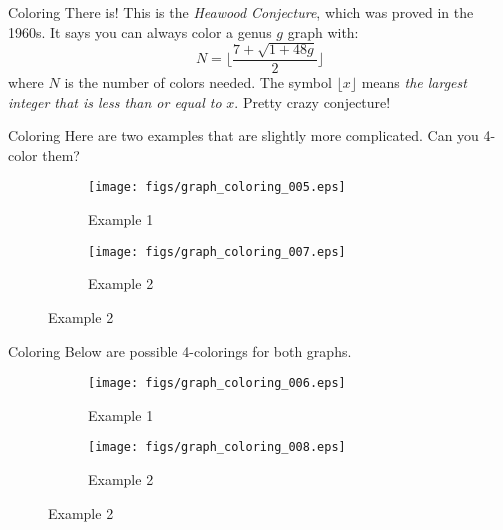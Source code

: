 \documentclass{beamer}
\newcommand{\floor}[2][]{#1\lfloor#2#1\rfloor}
\begin{document}
    \begin{frame}{Coloring}
        There is! This is the \textit{Heawood Conjecture}, which was proved in the 1960s. It
        says you can always color a genus $g$ graph with:
        \begin{equation}
            N=\floor{\frac{7+\sqrt{1+48g}}{2}}
        \end{equation}
        where $N$ is the number of colors needed. The symbol $\floor{x}$ means
        \textit{the largest integer that is less than or equal to} $x$. Pretty crazy
        conjecture!
    \end{frame}
    \begin{frame}{Coloring}
        Here are two examples that are slightly more complicated.
        Can you 4-color them?
        \begin{figure}
            \centering
            \begin{subfigure}[b]{0.49\textwidth}
                \centering
                \texttt{[image: figs/graph\_coloring\_005.eps]}
                \caption{Example 1}
                \label{fig:graph_coloring_005}
            \end{subfigure}
            \begin{subfigure}[b]{0.49\textwidth}
                \centering
                \texttt{[image: figs/graph\_coloring\_007.eps]}
                \caption{Example 2}
                \label{fig:graph_coloring_007}
            \end{subfigure}
        \end{figure}
    \end{frame}
    \begin{frame}{Coloring}
        Below are possible 4-colorings for both graphs.
        \begin{figure}
            \centering
            \begin{subfigure}[b]{0.49\textwidth}
                \centering
                \texttt{[image: figs/graph\_coloring\_006.eps]}
                \caption{Example 1}
                \label{fig:graph_coloring_006}
            \end{subfigure}
            \begin{subfigure}[b]{0.49\textwidth}
                \centering
                \texttt{[image: figs/graph\_coloring\_008.eps]}
                \caption{Example 2}
                \label{fig:graph_coloring_008}
            \end{subfigure}
        \end{figure}
    \end{frame}
\end{document}
